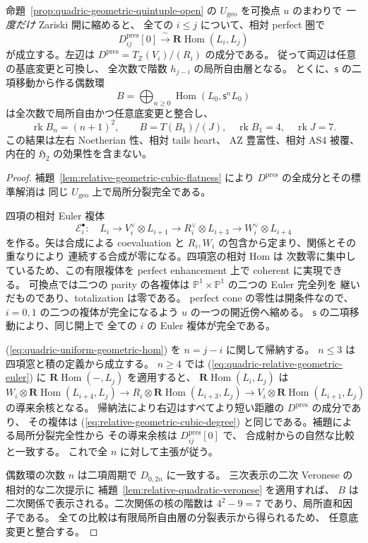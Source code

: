 \begin{proposition}
\label{prop:quadric-uniform-cubic-hom-open}
命題~\ref{prop:quadric-geometric-quintuple-open} の
$U_{\mathrm{geo}}$ を可換点 $u$ のまわりで
\emph{一度だけ} Zariski 開に縮めると、
全ての $i\le j$ について、相対 perfect 圏で
\[
 D^{\mathrm{pres}}_{ij}[0]
 \xrightarrow{\ \sim\ }
 \mathbf R\operatorname{Hom}(L_i,L_j)
 \tag{Geo-Hom}\label{eq:quadric-uniform-geometric-hom}
\]
が成立する。左辺は
$D^{\mathrm{pres}}=T_{\mathbb Z}(V_i)/(R_i)$ の成分である。
従って両辺は任意の基底変更と可換し、
全次数で階数 $h_{j-i}$ の局所自由層となる。
とくに、$\mathsf s$ の二項移動から作る偶数環
\[
 B=\bigoplus_{n\ge0}
   \operatorname{Hom}(L_0,\mathsf s^nL_0)
\]
は全次数で局所自由かつ任意底変更と整合し、
\[
 \operatorname{rk}B_n=(n+1)^2,\qquad
 B=T(B_1)/(J),\quad
 \operatorname{rk}B_1=4,\quad\operatorname{rk}J=7.
\]
この結果は左右 Noetherian 性、相対 tails heart、
AZ 豊富性、相対 AS4 被覆、内在的 $\mathfrak H_2$
の効果性を含まない。
\end{proposition}
\begin{proof}
補題~\ref{lem:relative-geometric-cubic-flatness} により
$D^{\mathrm{pres}}$ の全成分とその標準解消は
同じ $U_{\mathrm{geo}}$ 上で局所分裂完全である。

四項の相対 Euler 複体
\[
 \mathcal E_i^\bullet:\quad
 L_i\longrightarrow V_i^\vee\otimes L_{i+1}
 \longrightarrow R_i^\vee\otimes L_{i+3}
 \longrightarrow W_i^\vee\otimes L_{i+4}
 \tag{Geo-Euler}\label{eq:quadric-relative-geometric-euler}
\]
を作る。矢は合成による coevaluation と
$R_i,W_i$ の包含から定まり、関係とその重なりにより
連続する合成が零になる。四項窓の相対 Hom は
次数零に集中しているため、この有限複体を
perfect enhancement 上で coherent に実現できる。
可換点では二つの parity の各複体は
$\mathbb P^1\times\mathbb P^1$ の二つの Euler 完全列を
継いだものであり、totalization は零である。
perfect cone の零性は開条件なので、
$i=0,1$ の二つの複体が完全になるよう
$u$ の一つの開近傍へ縮める。
$\mathsf s$ の二項移動により、同じ開上で
全ての $i$ の Euler 複体が完全である。

(\ref{eq:quadric-uniform-geometric-hom}) を
$n=j-i$ に関して帰納する。
$n\le3$ は四項窓と積の定義から成立する。
$n\ge4$ では (\ref{eq:quadric-relative-geometric-euler}) に
$\mathbf R\operatorname{Hom}(-,L_j)$ を適用すると、
$\mathbf R\operatorname{Hom}(L_i,L_j)$ は
\[
 W_i\otimes\mathbf R\operatorname{Hom}(L_{i+4},L_j)
 \longrightarrow
 R_i\otimes\mathbf R\operatorname{Hom}(L_{i+3},L_j)
 \longrightarrow
 V_i\otimes\mathbf R\operatorname{Hom}(L_{i+1},L_j)
\]
の導来余核となる。
帰納法により右辺はすべてより短い距離の
$D^{\mathrm{pres}}$ の成分であり、
その複体は (\ref{eq:relative-geometric-cubic-degree})
と同じである。補題による局所分裂完全性から
その導来余核は $D^{\mathrm{pres}}_{ij}[0]$ で、
合成射からの自然な比較と一致する。
これで全 $n$ に対して主張が従う。

偶数環の次数 $n$ は二項周期で $D_{0,2n}$ に一致する。
三次表示の二次 Veronese の相対的な二次提示に
補題~\ref{lem:relative-quadratic-veronese} を適用すれば、
$B$ は二次関係で表示される。二次関係の核の階数は
$4^2-9=7$ であり、局所直和因子である。
全ての比較は有限局所自由層の分裂表示から得られるため、
任意底変更と整合する。
\end{proof}



